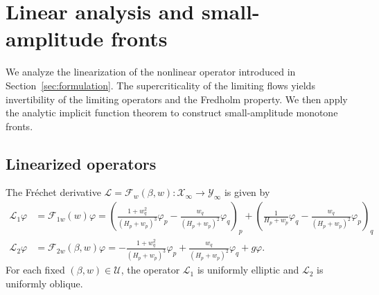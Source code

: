\documentclass[12pt,letterpaper]{amsart}
\numberwithin{equation}{section}
\begin{document}
	
	\section{{Linear analysis and small-amplitude fronts}}\label{sec:local-fronts}

{We analyze the linearization of the nonlinear operator introduced in Section~\ref{sec:formulation}. The supercriticality of the limiting flows yields invertibility of the limiting operators and the Fredholm property. We then apply the analytic implicit function theorem to construct small-amplitude monotone fronts.}

\subsection{{Linearized operators}}
	{The Fr\'echet derivative $\mathscr L=\mathcal F_w(\beta,w):\mathscr X_\infty\to\mathscr Y_\infty$ is given by}
	\begin{equation}\label{eq:fww}
		\begin{aligned}
			{\mathscr L_1\varphi}&=\mathcal{F}_{1w}(w)\varphi=
			\left( \frac{1 + w_q^2}{(H_{p} + w_p)^3} \varphi_p - \frac{w_q}{(H_{p} + w_p)^2} \varphi_q \right)_p
			+\left( \frac{1}{H_{p} + w_p} \varphi_q - \frac{w_q}{(H_{p} + w_p)^2} \varphi_p \right)_q\\
			{\mathscr L_2\varphi}&=\mathcal{F}_{2w}(\beta,w)\varphi=-\frac{1 + w_q^2}{(H_{p} + w_p)^3} \varphi_p + \frac{w_q}{(H_{p} + w_p)^2} \varphi_q + g \varphi.
		\end{aligned}
	\end{equation}
	{For each fixed $(\beta,w)\in\mathscr U$, the operator $\mathscr L_1$ is uniformly elliptic and $\mathscr L_2$ is uniformly oblique.}
	
\end{document}
